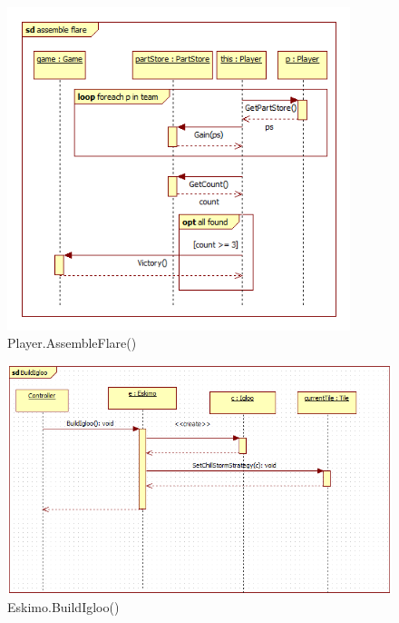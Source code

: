 \begin{figure}[H]
	\begin{center}
		\includegraphics[width=10cm]{chapters/chapter04/seqdiag/Player_assemble_flare.png}
		\caption{Player.AssembleFlare()}
		\label{fig:PlayerAssembleFlare2}
	\end{center}
\end{figure}
\begin{figure}[H]
	\begin{center}
		\includegraphics[width=15cm]{chapters/chapter04/seqdiag/Eskimo_BuildIgloo.png}
		\caption{Eskimo.BuildIgloo()}
		\label{fig:EskimoBuildIgloo}
	\end{center}
\end{figure}
